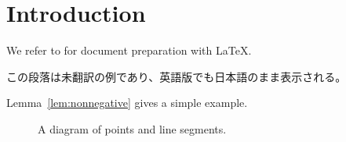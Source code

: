 \section{Introduction}\label{sec:introduction}

We refer to \cite{lamport1994} for document preparation with \LaTeX{}.

この段落は未翻訳の例であり、英語版でも日本語のまま表示される。


Lemma~\ref{lem:nonnegative} gives a simple example.

\begin{figure}[htbp]
    \centering
    
    \caption{A diagram of points and line segments.}\label{fig:segments}
\end{figure}
